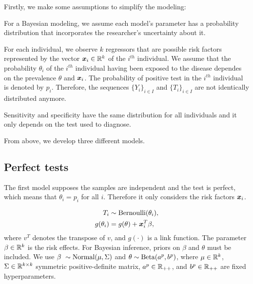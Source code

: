 Firstly, we make some assumptions to simplify the modeling:

\begin{assumption}  
  For a Bayesian modeling, we assume each model's parameter has a probability distribution that incorporates the researcher's uncertainty about it. 
\end{assumption}

\begin{assumption}
  For each individual, we observe $k$ regressors that are possible
  risk factors represented by the vector $\boldsymbol{x}_i \in \mathbb{R}^{k}$ of the $i^{th}$
  individual. We assume that the probability $\theta_i$ of the $i^{th}$ individual having been exposed
  to the disease dependes on the prevalence $\theta$ and $\boldsymbol{x}_i$. The
  probability of positive test in the $i^{th}$ individual is denoted by $p_i$. Therefore, the sequences $\{Y_i\}_{i \in I}$ and $\{T_i\}_{i \in I}$ are not
  identically distributed anymore.
\end{assumption}

\begin{assumption}
  Sensitivity and specificity have the same distribution for all
  individuals and it only depends on the test used to diagnose. 
\end{assumption}

From above, we develop three different models.

\subsection{Perfect tests}

The first model supposes the samples are independent and the test is perfect,
which means that $\theta_i = p_i$ for all $i$. Therefore it only considers the risk factors $\boldsymbol{x}_i$. 

\begin{equation}
  \begin{aligned}
    T_i &\sim \operatorname{Bernoulli}(\theta_i), \\
    g(\theta_i) &= g(\theta) + \boldsymbol{x}_i^T\beta, 
  \end{aligned}  
\end{equation}
where $v^T$ denotes the transpose of $v$, and $g(\cdot)$ is a link function.
The parameter $\beta \in \mathbb{R}^{k}$ is the risk effects. For Bayesian inference, priors on
$\beta$ and $\theta$ must be included. We use $\beta ~ \sim \operatorname{Normal}(\mu, \Sigma)$
and $\theta \sim \operatorname{Beta}(a^{p}, b^p)$, where $\mu
\in \mathbb{R}^{k}$, $\Sigma \in \mathbb{R}^{k\times k}$ symmetric positive-definite matrix,
$a^p \in \mathbb{R}_{++}$, and $b^p \in \mathbb{R}_{++}$
are fixed hyperparameters. 

